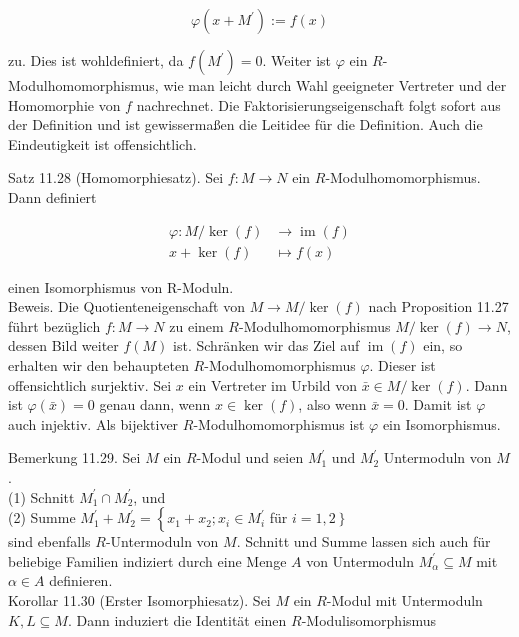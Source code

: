 \documentclass[10pt, letterpaper]{article}
\begin{document}
$$
\varphi\left(x+M^{\prime}\right):=f(x)
$$

zu. Dies ist wohldefiniert, da $f\left(M^{\prime}\right)=0$. Weiter ist $\varphi$ ein $R$-Modulhomomorphismus, wie man leicht durch Wahl geeigneter Vertreter und der Homomorphie von $f$ nachrechnet. Die Faktorisierungseigenschaft folgt sofort aus der Definition und ist gewissermaßen die Leitidee für die Definition. Auch die Eindeutigkeit ist offensichtlich.

Satz 11.28 (Homomorphiesatz). Sei $f: M \rightarrow N$ ein $R$-Modulhomomorphismus. Dann definiert

$$
\begin{aligned}
\varphi: M / \operatorname{ker}(f) & \rightarrow \operatorname{im}(f) \\
x+\operatorname{ker}(f) & \mapsto f(x)
\end{aligned}
$$

einen Isomorphismus von R-Moduln.\\
Beweis. Die Quotienteneigenschaft von $M \rightarrow M / \operatorname{ker}(f)$ nach Proposition 11.27 führt bezüglich $f: M \rightarrow N$ zu einem $R$-Modulhomomorphismus $M / \operatorname{ker}(f) \rightarrow N$, dessen Bild weiter $f(M)$ ist. Schränken wir das Ziel auf $\operatorname{im}(f)$ ein, so erhalten wir den behaupteten $R$-Modulhomomorphismus $\varphi$. Dieser ist offensichtlich surjektiv. Sei $x$ ein Vertreter im Urbild von $\bar{x} \in M / \operatorname{ker}(f)$. Dann ist $\varphi(\bar{x})=0$ genau dann, wenn $x \in \operatorname{ker}(f)$, also wenn $\bar{x}=0$. Damit ist $\varphi$ auch injektiv. Als bijektiver $R$-Modulhomomorphismus ist $\varphi$ ein Isomorphismus.

Bemerkung 11.29. Sei $M$ ein $R$-Modul und seien $M_{1}^{\prime}$ und $M_{2}^{\prime}$ Untermoduln von $M$.\\
(1) Schnitt $M_{1}^{\prime} \cap M_{2}^{\prime}$, und\\
(2) Summe $M_{1}^{\prime}+M_{2}^{\prime}=\left\{x_{1}+x_{2} ; x_{i} \in M_{i}^{\prime}\right.$ für $\left.i=1,2\right\}$\\
sind ebenfalls $R$-Untermoduln von $M$. Schnitt und Summe lassen sich auch für beliebige Familien indiziert durch eine Menge $A$ von Untermoduln $M_{\alpha}^{\prime} \subseteq M$ mit $\alpha \in A$ definieren.\\
Korollar 11.30 (Erster Isomorphiesatz). Sei $M$ ein $R$-Modul mit Untermoduln $K, L \subseteq M$. Dann induziert die Identität einen $R$-Modulisomorphismus
\end{document}
